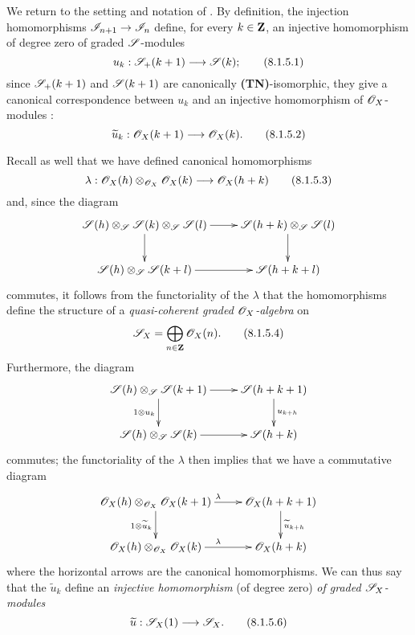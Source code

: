 \begin{env}[8.1.5]
\label{2.8.1.5}
We return to the setting and notation of .
By definition, the injection homomorphisms $\sh{I}_{n+1}\to\sh{I}_n$  define, for every $k\in\mathbf{Z}$, an injective homomorphism of degree zero of graded $\mathscr{S}$-modules
\[
\label{eq:2.8.1.5.1}
  u_k: \sh{S}_+(k+1) \to \sh{S}(k);
\tag{8.1.5.1}
\]
since $\mathscr{S}_+(k+1)$ and $\mathscr{S}(k+1)$ are canonically \textbf{(TN)}-isomorphic, they give a canonical correspondence between $u_k$ and an injective homomorphism of $\mathscr{O}_X$-modules :
\[
\label{eq:2.8.1.5.2}
  \widetilde{u}_k: \sh{O}_X(k+1) \to \sh{O}_X(k).
\tag{8.1.5.2}
\]

Recall as well  that we have defined canonical homomorphisms
\[
\label{eq:2.8.1.5.3}
  \lambda: \sh{O}_X(h) \otimes_{\sh{O}_X} \sh{O}_X(k) \to \sh{O}_X(h+k)
\tag{8.1.5.3}
\]
and, since the diagram
\[
  \xymatrix{
    \sh{S}(h) \otimes_{\sh{S}} \sh{S}(k) \otimes_{\sh{S}} \sh{S}(l)
      \ar[r]
      \ar[d]
  & \sh{S}(h+k) \otimes_{\sh{S}} \sh{S}(l)
      \ar[d]
  \\\sh{S}(h) \otimes_{\sh{S}} \sh{S}(k+l)
      \ar[r]
  & \sh{S}(h+k+l)
  }
\]
commutes, it follows from the functoriality of the $\lambda$  that the homomorphisms  define the structure of a \emph{quasi-coherent graded $\mathscr{O}_X$-algebra} on
\[
\label{eq:2.8.1.5.4}
  \mathscr{S}_X = \bigoplus_{n\in\mathbf{Z}}\mathscr{O}_X(n).
\tag{8.1.5.4}
\]
Furthermore, the diagram
\[
  \xymatrix{
    \sh{S}(h) \otimes_{\sh{S}} \sh{S}(k+1)
      \ar[r]
      \ar[d]_{1\otimes u_k}
  & \sh{S}(h+k+1)
      \ar[d]^{u_{k+h}}
  \\\sh{S}(h) \otimes_{\sh{S}} \sh{S}(k)
      \ar[r]
  & \sh{S}(h+k)
  }
\]
commutes; the functoriality of the $\lambda$ then implies that we have a commutative diagram
\[
  \xymatrix{
    \sh{O}_X(h) \otimes_{\sh{O}_X} \sh{O}_X(k+1)
      \ar[r]^{\lambda}
      \ar[d]_{1\otimes \widetilde{u}_k}
  & \sh{O}_X(h+k+1)
      \ar[d]^{\widetilde{u}_{k+h}}
  \\\sh{O}_X(h) \otimes_{\sh{O}_X} \sh{O}_X(k)
      \ar[r]^{\lambda}
  & \sh{O}_X(h+k)
  }
\]
where the horizontal arrows are the canonical homomorphisms.
We can thus say that the $\widetilde{u}_k$ define an \emph{injective homomorphism} (of degree zero) \emph{of graded $\mathscr{S}_X$-modules}
\[
\label{eq:2.8.1.5.6}
  \widetilde{u}: \sh{S}_X(1) \to \sh{S}_X.
\tag{8.1.5.6}
\]
\end{env}


